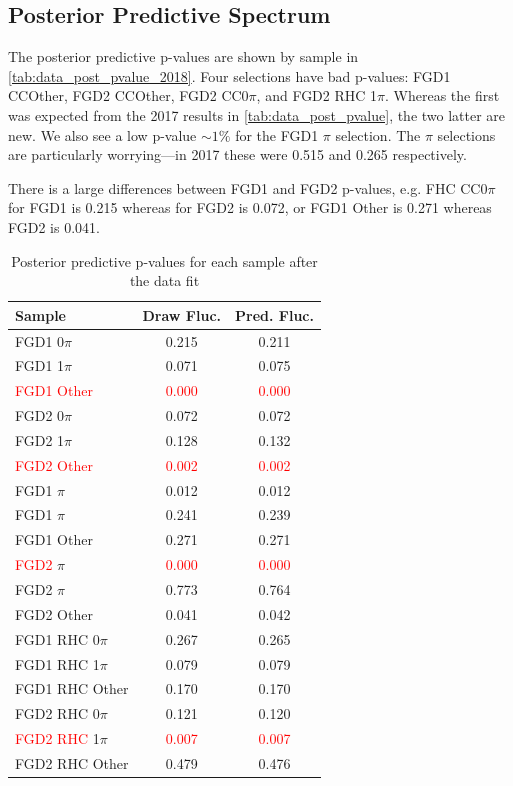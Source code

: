 \subsection{Posterior Predictive Spectrum}
The posterior predictive p-values are shown by sample in \autoref{tab:data_post_pvalue_2018}. Four selections have bad p-values: FGD1 CCOther, FGD2 CCOther, FGD2 \numubar CC0$\pi$, and FGD2 \numu RHC 1$\pi$. Whereas the first was expected from the 2017 results in \autoref{tab:data_post_pvalue}, the two latter are new. We also see a low p-value $\sim1\%$ for the FGD1 $\pi$ selection. The $\pi$ selections are particularly worrying---in 2017 these were 0.515 and 0.265 respectively.

There is a large differences between FGD1 and FGD2 p-values, e.g. FHC CC0$\pi$ for FGD1 is 0.215 whereas for FGD2 is 0.072, or FGD1 \numubar Other is 0.271 whereas FGD2 is 0.041.
\begin{table}[h]
	\centering
	\begin{tabular}{l | c c }
		\hline \hline
		Sample & Draw Fluc. & Pred. Fluc. \\
		\hline
		FGD1 0$\pi$ & 0.215 & 0.211 \\
		FGD1 1$\pi$ & 0.071 & 0.075 \\
		\textcolor{red}{FGD1 Other}  & \textcolor{red}{0.000} & \textcolor{red}{0.000} \\
		\hline
		FGD2 0$\pi$ & 0.072 & 0.072 \\
		FGD2 1$\pi$ & 0.128 & 0.132 \\
		\textcolor{red}{FGD2 Other}  & \textcolor{red}{0.002} & \textcolor{red}{0.002} \\
		\hline
		FGD1 \numubar 0$\pi$ & 0.012 & 0.012 \\
		FGD1 \numubar 1$\pi$ & 0.241 & 0.239 \\
		FGD1 \numubar Other  & 0.271 & 0.271 \\
		\hline
		\textcolor{red}{FGD2} \numubar 0$\pi$ & \textcolor{red}{0.000} & \textcolor{red}{0.000} \\
		FGD2 \numubar 1$\pi$ & 0.773 & 0.764 \\
		FGD2 \numubar Other  & 0.041 & 0.042 \\
		\hline
		FGD1 \numu RHC 0$\pi$ & 0.267 & 0.265 \\
		FGD1 \numu RHC 1$\pi$ & 0.079 & 0.079 \\
		FGD1 \numu RHC Other  & 0.170 & 0.170 \\
		\hline
		FGD2 \numu RHC 0$\pi$ & 0.121 & 0.120 \\
		\textcolor{red}{FGD2} \numu \textcolor{red}{RHC} 1$\pi$ & \textcolor{red}{0.007} & \textcolor{red}{0.007} \\
		FGD2 \numu RHC Other  & 0.479 & 0.476 \\
		\hline
		\hline
	\end{tabular}
	\caption{Posterior predictive p-values for each sample after the data fit}
	\label{tab:data_post_pvalue_2018}
\end{table}

